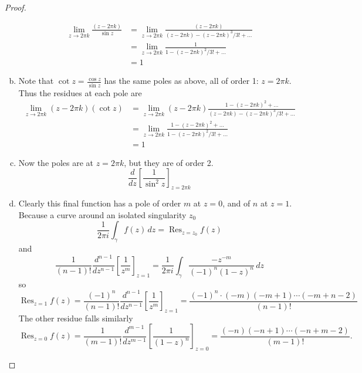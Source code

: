 \documentclass{article}
\begin{document}
\begin{proof}
\begin{enumerate}[(a)]
\begin{align*}
        \lim_{z \rightarrow 2\pi k} \frac{(z - 2\pi k)}{\sin z}
        &= \lim_{z \rightarrow 2\pi k} \frac{(z - 2\pi k)}{(z - 2\pi k) - (z - 2\pi k)^3/3! + \hdots} \\
        &= \lim_{z \rightarrow 2\pi k} \frac{1}{1 - (z - 2\pi k)^2/3! + \hdots} \\
        &= 1
      \end{align*}
    \item Note that $\displaystyle \cot z = \frac{\cos z}{\sin z}$ has the same
      poles as above, all of order 1: $z= 2\pi k$. Thus the residues at each pole are \begin{align*}
        \lim_{z \rightarrow 2\pi k} (z - 2\pi k)(\cot z)
        &= \lim_{z \rightarrow 2\pi k} (z - 2\pi k)\frac{1 - (z - 2\pi k)^2 + \hdots}{(z - 2\pi k) - (z - 2\pi k)^3/3! + \hdots} \\
        &= \lim_{z \rightarrow 2\pi k} \frac{1 - (z - 2\pi k)^2 + \hdots}{1 - (z - 2\pi k)^2/3! + \hdots} \\
        &= 1
      \end{align*}
    \item Now the poles are at $z = 2\pi k$, but they are of order 2. \[
      \frac{d}{dz}\left[\frac{1}{\sin^2 z}\right]_{z = 2\pi k}
    \]
    \item Clearly this final function has a pole of order $m$ at $z=0$, and of
      $n$ at $z=1$. Because a curve around an isolated singularity $z_0$ \[
        \frac{1}{2\pi i} \int_\gamma f(z)\,dz = \operatorname{Res}_{z = z_0} f(z)
      \] and \[
        \frac{1}{(n - 1)!}\frac{d^{n-1}}{dz^{n-1}}\left[\frac{1}{z^m}\right]_{z = 1} = \frac{1}{2\pi i} \int_\gamma \frac{-z^{-m}}{(-1)^n(1-z)^n}\,dz
      \] so \[
        \operatorname{Res}_{z = 1} f(z)
          = \frac{(-1)^n}{(n - 1)!}\frac{d^{n - 1}}{dz^{n - 1}}\left[\frac{1}{z^m}\right]_{z = 1}
          = \frac{(-1)^n\cdot(-m)(-m + 1)\cdots(-m + n - 2)}{(n-1)!}
      \]
      The other residue falls similarly \[
      \operatorname{Res}_{z = 0} f(z)
        = \frac{1}{(m - 1)!}\frac{d^{m - 1}}{dz^{m - 1}}\left[\frac{1}{(1-z)^n}\right]_{z = 0}
        = \frac{(-n)(-n + 1)\cdots(-n + m - 2)}{(m-1)!}.
      \]
  \end{enumerate}
\end{proof}
\pagebreak
\end{document}

